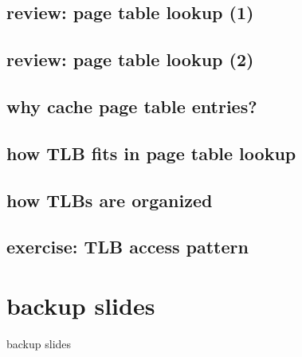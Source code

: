 \subsection{review: page table lookup (1)}


\subsection{review: page table lookup (2)}

\subsection{why cache page table entries?}


\subsection{how TLB fits in page table lookup}


\subsection{how TLBs are organized}

\subsection{exercise: TLB access pattern}



\section{backup slides}
\begin{frame}{backup slides}
\end{frame}


